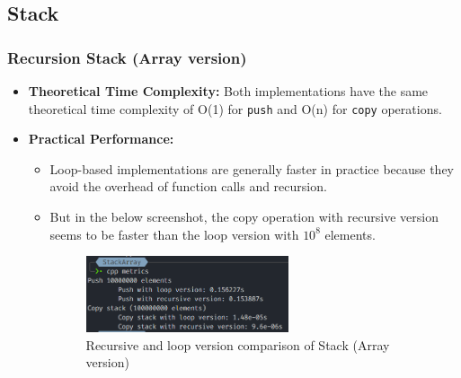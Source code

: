\thispagestyle{empty}
\subsection{Stack}
\subsubsection*{Recursion Stack (Array version)}
\begin{itemize}
	\item \textbf{Theoretical Time Complexity:} Both implementations have the same theoretical time complexity of O(1) for \verb|push| and O(n) for \verb|copy| operations.
	\item \textbf{Practical Performance:}
	      \begin{itemize}
		      \item  Loop-based implementations are generally faster in practice because they avoid the overhead of function calls and recursion.
		      \item But in the below screenshot, the copy operation with recursive version seems to be faster than the loop version with \(10^{8}\) elements.
		            \begin{figure}[!ht]
			            \centering
			            \includegraphics[width=0.6\textwidth]{imgs/StackArray/metrics.png}
			            \caption{Recursive and loop version comparison of Stack (Array version)}\label{fig:stack_arr_metrics}
		            \end{figure}
	      \end{itemize}
\end{itemize}

